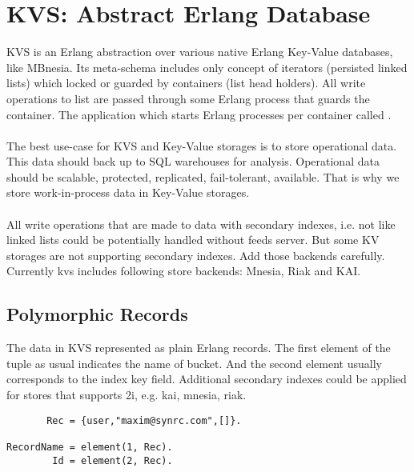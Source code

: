 \section{KVS: Abstract Erlang Database}

KVS is an Erlang abstraction over various native Erlang Key-Value databases,
like MBnesia. Its meta-schema includes only concept
of iterators (persisted linked lists) which locked or guarded by
containers (list head holders). All write operations to list are
passed through some Erlang process that guards the container. The application
which starts Erlang processes per container called .

\paragraph{}
The best use-case for KVS and Key-Value storages is to store operational data.
This data should back up to SQL warehouses for analysis. Operational data
should be scalable, protected, replicated, fail-tolerant, available. That is why
we store work-in-process data in Key-Value storages.

\paragraph{}
All write operations that are made to data with secondary indexes,
i.e. not like linked lists could be potentially handled without
feeds server. But some KV storages are not supporting secondary
indexes. Add those backends carefully. Currently kvs includes
following store backends: Mnesia, Riak and KAI.

\subsection{Polymorphic Records}

The data in KVS represented as plain Erlang records.
The first element of the tuple as usual indicates the name of bucket.
And the second element usually corresponds to the index key field.
Additional secondary indexes could be applied for stores that
supports 2i, e.g. kai, mnesia, riak.

\begin{lstlisting}
       Rec = {user,"maxim@synrc.com",[]}.

RecordName = element(1, Rec).
        Id = element(2, Rec).
\end{lstlisting}

